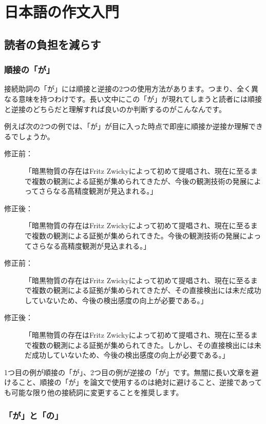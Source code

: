 \chapter{日本語の作文入門}

\section{読者の負担を減らす}

\subsection{順接の「が」}

接続助詞の「が」には順接と逆接の2つの使用方法があります。つまり、全く異なる意味を持つわけです。長い文中にこの「が」が現れてしまうと読者には順接と逆接のどちらだと理解すれば良いのか判断するのがこんなんです。

例えば次の2つの例では、「が」が目に入った時点で即座に順接か逆接か理解できるでしょうか。

\begin{description}
\item[修正前：]「暗黒物質の存在はFritz Zwickyによって初めて提唱され、現在に至るまで複数の観測による証拠が集められてきたが、今後の観測技術の発展によってさらなる高精度観測が見込まれる。」
\item[修正後：]「暗黒物質の存在はFritz Zwickyによって初めて提唱され、現在に至るまで複数の観測による証拠が集められてきた。今後の観測技術の発展によってさらなる高精度観測が見込まれる。」
\end{description}

\begin{description}
\item[修正前：]「暗黒物質の存在はFritz Zwickyによって初めて提唱され、現在に至るまで複数の観測による証拠が集められてきたが、その直接検出には未だ成功していないため、今後の検出感度の向上が必要である。」
\item[修正後：]「暗黒物質の存在はFritz Zwickyによって初めて提唱され、現在に至るまで複数の観測による証拠が集められてきた。しかし、その直接検出には未だ成功していないため、今後の検出感度の向上が必要である。」
\end{description}

1つ目の例が順接の「が」、2つ目の例が逆接の「が」です。無闇に長い文章を避けること、順接の「が」を論文で使用するのは絶対に避けること、逆接であっても可能な限り他の接続詞に変更することを推奨します。

\subsection{「が」と「の」}


